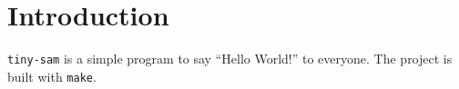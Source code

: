 \documentclass{article}
\begin{document}
\section{Introduction}
\texttt{tiny-sam} is a simple program to say ``Hello World!'' to everyone.
The project is built with \texttt{make}\cite{Mecklenburg:2004aa}.
\printbibliography
\end{document}

